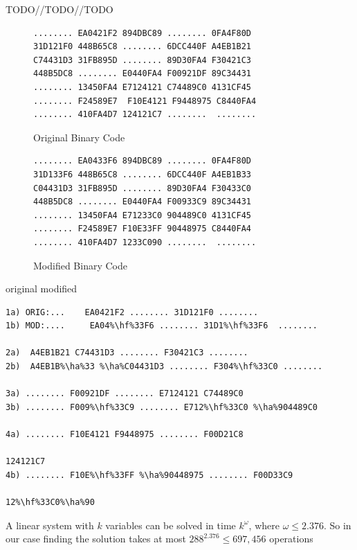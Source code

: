 \documentclass[conference]{IEEEtran}
\begin{document}
TODO//TODO//TODO

\begin{figure}[H]
\begin{lstlisting}[style=hex, frame=tlrb]
........ EA0421F2 894DBC89 ........ 0FA4F80D
31D121F0 448B65C8 ........ 6DCC440F A4EB1B21
C74431D3 31FB895D ........ 89D30FA4 F30421C3
448B5DC8 ........ E0440FA4 F00921DF 89C34431
........ 13450FA4 E7124121 C74489C0 4131CF45
........ F24589E7  F10E4121 F9448975 C8440FA4
........ 410FA4D7 124121C7 ........  ........
\end{lstlisting}
\caption{Original Binary Code}
\end{figure}

\begin{figure}[H]
\begin{lstlisting}[style=hex, frame=tlrb]
........ EA0433F6 894DBC89 ........ 0FA4F80D 
31D133F6 448B65C8 ........ 6DCC440F A4EB1B33
C04431D3 31FB895D ........ 89D30FA4 F30433C0 
448B5DC8 ........ E0440FA4 F00933C9 89C34431
........ 13450FA4 E71233C0 904489C0 4131CF45
........ F24589E7 F10E33FF 90448975 C8440FA4 
........ 410FA4D7 1233C090 ........  ........
\end{lstlisting}
\caption{Modified Binary Code}
\end{figure}


original
modified
\newcommand{\hf}{\makebox[0pt][l]{\color{green}\rule[-3pt]{0.08\linewidth}{11pt}}}
\newcommand{\ha}{\makebox[0pt][l]{\color{green}\rule[-3pt]{0.04\linewidth}{11pt}}}

\begin{lstlisting}[style=hex, frame=tlrb, escapechar=\%]
1a) ORIG:...    EA0421F2 ........ 31D121F0 ........
1b) MOD:....     EA04%\hf%33F6 ........ 31D1%\hf%33F6  ........

2a)  A4EB1B21 C74431D3 ........ F30421C3 ........
2b)  A4EB1B%\ha%33 %\ha%C04431D3 ........ F304%\hf%33C0 ........

3a) ........ F00921DF ........ E7124121 C74489C0
3b) ........ F009%\hf%33C9 ........ E712%\hf%33C0 %\ha%904489C0 

4a) ........ F10E4121 F9448975 ........ F00D21C8

124121C7
4b) ........ F10E%\hf%33FF %\ha%90448975 ........ F00D33C9

12%\hf%33C0%\ha%90
\end{lstlisting}

A linear system with $k$ variables can be solved in time $k^\omega$, where $\omega \leq 2.376$.
So in our case finding the solution takes at most $288^{2.376} \leq 697,456$ operations
\end{document}
